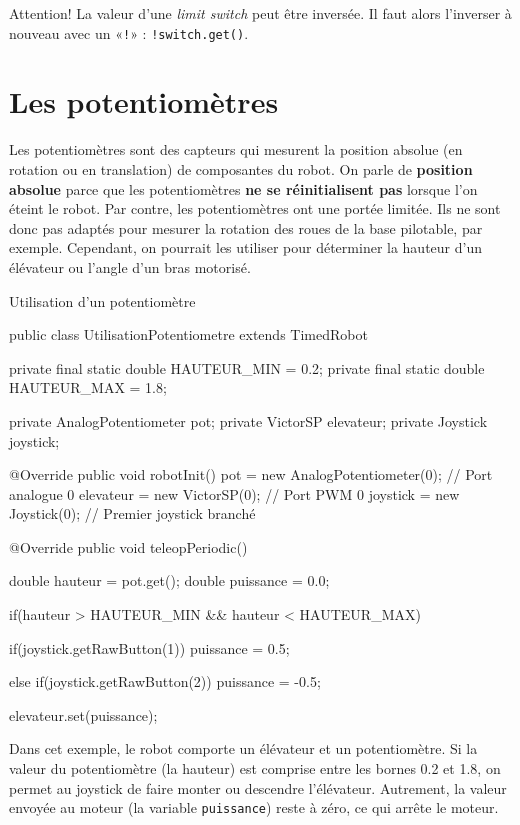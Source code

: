 \documentclass[12pt]{report}
\begin{document}
Attention! La valeur d'une \textit{limit switch} peut être inversée. Il faut alors l'inverser à nouveau avec un «\texttt{!}» : \texttt{!switch.get()}.


\section{Les potentiomètres}

Les potentiomètres sont des capteurs qui mesurent la position absolue (en rotation ou en translation) de composantes du robot. On parle de \textbf{position absolue} parce que les potentiomètres \textbf{ne se réinitialisent pas} lorsque l'on éteint le robot. Par contre, les potentiomètres ont une portée limitée. Ils ne sont donc pas adaptés pour mesurer la rotation des roues de la base pilotable, par exemple. Cependant, on pourrait les utiliser pour déterminer la hauteur d'un élévateur ou l'angle d'un bras motorisé.

\begin{MyTCB}{Utilisation d'un potentiomètre}

public class UtilisationPotentiometre extends TimedRobot {

	private final static double HAUTEUR_MIN = 0.2;
	private final static double HAUTEUR_MAX = 1.8;

	private AnalogPotentiometer pot;
	private VictorSP elevateur;
	private Joystick joystick;
	
	@Override
	public void robotInit() {
		pot = new AnalogPotentiometer(0); // Port analogue 0
		elevateur = new VictorSP(0); // Port PWM 0
		joystick = new Joystick(0); // Premier joystick branché
	}
	
	@Override
	public void teleopPeriodic() {

		double hauteur = pot.get();
		double puissance = 0.0;
		
		if(hauteur > HAUTEUR_MIN && hauteur < HAUTEUR_MAX) {

			if(joystick.getRawButton(1))
				puissance = 0.5;
				
			else if(joystick.getRawButton(2))
				puissance = -0.5;			
			
		}	
		
		elevateur.set(puissance);
		
	}

}

\end{MyTCB}

Dans cet exemple, le robot comporte un élévateur et un potentiomètre. Si la valeur du potentiomètre (la hauteur) est comprise entre les bornes 0.2 et 1.8, on permet au joystick de faire monter ou descendre l'élévateur. Autrement, la valeur envoyée au moteur (la variable \texttt{puissance}) reste à zéro, ce qui arrête le moteur.
\end{document}
